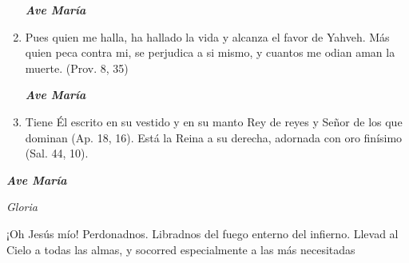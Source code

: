 \documentclass[a4paper,11pt, oneside]{report}
\begin{document}
\begin{enumerate}
        \textbf{\textit{Ave María}}

        \item Pues quien me halla, ha hallado la vida y alcanza el favor de Yahveh. Más quien peca contra mi, se perjudica a si mismo,
        y cuantos me odian aman la muerte. (Prov. 8, 35)

        \textbf{\textit{Ave María}}

        \item Tiene Él escrito en su vestido y en su manto Rey de reyes y Señor de los que dominan (Ap. 18, 16).
        Está la Reina a su derecha, adornada con oro finísimo (Sal. 44, 10).
      \end{enumerate}

      \textbf{\textit{Ave María}} \par
      \indent\textit{Gloria} \par
      \indent¡Oh Jesús mío! Perdonadnos. Libradnos del fuego enterno del infierno. Llevad al Cielo a todas las almas, y socorred especialmente a las más 
      necesitadas
      
\end{document}
